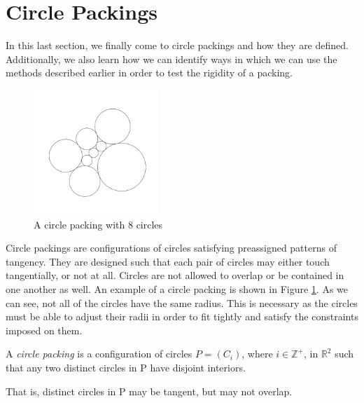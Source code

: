 
\section{Circle Packings}

\begin{flushleft}
 In this last section, we finally come to circle packings and how they are defined. Additionally, we also learn how we can identify ways in which we can use the methods described earlier in order to test the rigidity of a packing. 
\end{flushleft}

\begin{figure}[htbp]
    \centering
    \includegraphics[width = 0.42\textwidth]{Chapter 3/7. Plain packing.png}
    \caption{A circle packing with 8 circles}
    \label{fig: circle packing example}
\end{figure}
\vspace{-4 mm}
\begin{flushleft}
Circle packings are configurations of circles satisfying preassigned patterns of tangency. They are designed such that each pair of circles may either touch tangentially, or not at all. Circles are not allowed to overlap or be contained in one another as well. An example of a circle packing is shown in Figure \ref{fig: circle packing example}. As we can see, not all of the circles have the same radius. This is necessary as the circles must be able to adjust their radii in order to fit tightly and satisfy the constraints imposed on them.
\end{flushleft}

\begin{definition}
\label{def: circle packing}
A \textit{circle packing} is a configuration of circles $P = (C_i)$, where $i \in \mathbb{Z}^+$, in $\mathbb{R}^2$ such that any
two distinct circles in P have disjoint interiors. 

\noindent
That is, distinct circles in P may be tangent, but may not overlap.
\end{definition}

